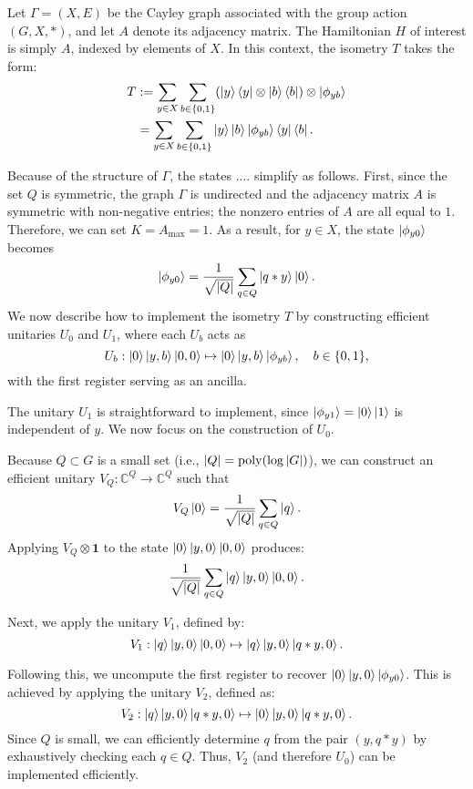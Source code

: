 \documentclass[12pt]{report}
\begin{document}
Let \( \Gamma = (X, E) \) be the Cayley graph associated with the group action \( (G, X, *) \), and let \( A \) denote its adjacency matrix. The Hamiltonian \( H \) of interest is simply \( A \), indexed by elements of \( X \). In this context, the isometry \( T \) takes the form:
\begin{align*}
T
& := \sum_{y \in X} \sum_{b \in \{0, 1\}} (\ket{y}\bra{y} \otimes \ket{b}\bra{b}) \otimes \ket{\phi_{yb}} \\
& = \sum_{y \in X} \sum_{b \in \{0, 1\}} \ket{y} \ket{b} \ket{\phi_{yb}} \bra{y} \bra{b}.
\end{align*}


Because of the structure of $\Gamma$, the states .... simplify as follows. First, since the set $Q$ is symmetric, the graph $\Gamma$ is undirected and the adjacency matrix $A$ is symmetric with non-negative entries; the nonzero entries of $A$ are all equal to $1$. Therefore, we can set $K = {A}_{\mathrm{max}} = 1$. As a result, for $y \in X$, the state $\ket{\phi_{y0}}$ becomes
\[ \ket{\phi_{y0}} = \frac{1}{\sqrt{\abs{Q}}} \sum_{q \in Q} \ket{q * y} \ket{0}. \]
We now describe how to implement the isometry \( T \) by constructing efficient unitaries \( U_0 \) and \( U_1 \), where each \( U_b \) acts as
\[
U_b : \ket{0} \ket{y, b} \ket{0, 0} \mapsto \ket{0} \ket{y, b} \ket{\phi_{yb}}, \quad b \in \{0, 1\},
\]
with the first register serving as an ancilla.

The unitary \( U_1 \) is straightforward to implement, since \( \ket{\phi_{y1}} = \ket{0} \ket{1} \) is independent of \( y \). We now focus on the construction of \( U_0 \).

Because \( Q \subset G \) is a small set (i.e., \( \abs{Q} = \operatorname{poly}(\log \abs{G}) \)), we can construct an efficient unitary \( V_Q : \mathbb{C}^Q \to \mathbb{C}^Q \) such that
\[
V_Q \ket{0} = \frac{1}{\sqrt{\abs{Q}}} \sum_{q \in Q} \ket{q}.
\]
Applying \( V_Q \otimes \mathbf{1} \) to the state \( \ket{0} \ket{y, 0} \ket{0, 0} \) produces:
\[
\frac{1}{\sqrt{\abs{Q}}} \sum_{q \in Q} \ket{q} \ket{y, 0} \ket{0, 0}.
\]

Next, we apply the unitary \( V_1 \), defined by:
\[
V_1 : \ket{q} \ket{y, 0} \ket{0, 0} \mapsto \ket{q} \ket{y, 0} \ket{q * y, 0}.
\]

Following this, we uncompute the first register to recover \( \ket{0} \ket{y, 0} \ket{\phi_{y0}} \). This is achieved by applying the unitary \( V_2 \), defined as:
\[
V_2 : \ket{q} \ket{y, 0} \ket{q * y, 0} \mapsto \ket{0} \ket{y, 0} \ket{q * y, 0}.
\]
Since \( Q \) is small, we can efficiently determine \( q \) from the pair \( (y, q * y) \) by exhaustively checking each \( q \in Q \). Thus, \( V_2 \) (and therefore \( U_0 \)) can be implemented efficiently.
\end{document}
